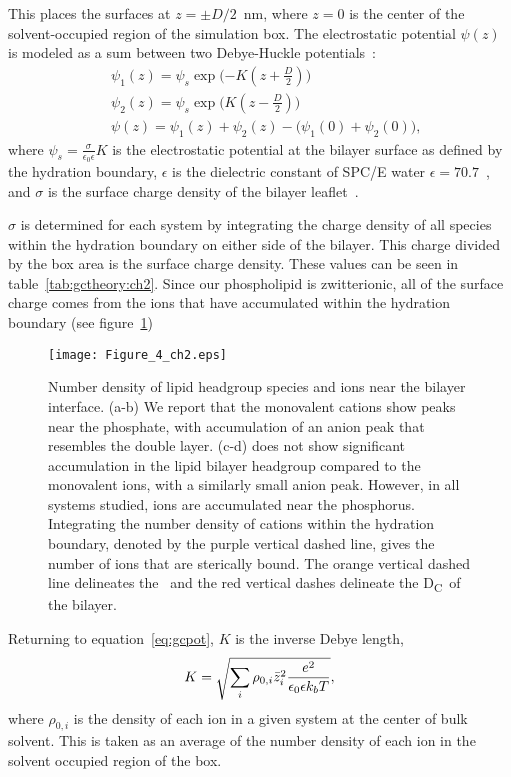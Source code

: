 This places the surfaces at $z=\pm D/2$~nm, where $z=0$ is the center of the solvent-occupied region of the simulation box.
The electrostatic potential $\psi(z)$ is modeled as a sum between two Debye-Huckle potentials~\cite{israelachvili:2011:intermol}:
\begin{align}
    &\psi_{1}(z) = \psi_s \exp\bigg({-K(z+\frac{D}{2})}\bigg)\\
    &\psi_{2}(z) = \psi_s \exp\bigg({K(z-\frac{D}{2})}\bigg)\\
    \label{eq:gcpot}
    &\psi(z) = \psi_1(z) + \psi_2(z) - \big({\psi_1(0)+\psi_2(0)}\big)\text{,}
\end{align}
where $\psi_s = \frac{\sigma}{\epsilon_0\epsilon} K$ is the electrostatic potential at the bilayer surface
as defined by the hydration boundary, $\epsilon$ 
is the dielectric constant of SPC/E water $\epsilon=70.7$~\cite{reddy:1989:dielectric}, and $\sigma$
is the surface charge density of the bilayer leaflet~\cite{israelachvili:2011:intermol}. 

$\sigma$ is determined for
each system by integrating the charge density of all species within the hydration boundary on either side of the bilayer.
This charge divided by the box area is the surface charge density.
These values can be seen in table~\ref{tab:gctheory:ch2}. {Since our
    phospholipid is zwitterionic, all of the surface charge comes from the
ions that have accumulated within 
the hydration boundary (see figure~\ref{fig:dens:ch2})}
\begin{figure}
    \caption[Number densities]{Number density of lipid headgroup species and
    ions near the bilayer interface. (a-b) We report that the 
    monovalent cations show peaks near the phosphate, with
    accumulation of an anion peak that resembles the double layer.
    (c-d) \mg does not show significant accumulation in the 
    lipid bilayer headgroup compared to the monovalent ions,
    with a similarly small anion peak. However, in all systems
    studied, ions are accumulated near the phosphorus.
    Integrating the number density of cations within the hydration boundary,
    denoted by the purple vertical dashed line, gives the number of ions that are
    sterically bound. The orange vertical dashed line delineates the \dhh~and the 
    red vertical dashes
delineate the D\textsubscript{C}~of the bilayer.}
    \label{fig:dens:ch2}
    \texttt{[image: Figure\_4\_ch2.eps]}
\end{figure}

Returning to equation~\ref{eq:gcpot}, $K$ is the inverse Debye length,
\begin{equation}
K=\sqrt{\sum_{i} \rho_{0,i} \bar z_i^2\frac{\text{\si{\elementarycharge}}^2}{\epsilon_0 \epsilon k_bT}},
\label{eq:debyelength}
\end{equation}
where $\rho_{0,i}$ is the density of each ion in a given system at the center of bulk solvent.
This is taken as an average of the number density of each ion in the solvent occupied region of the box.

